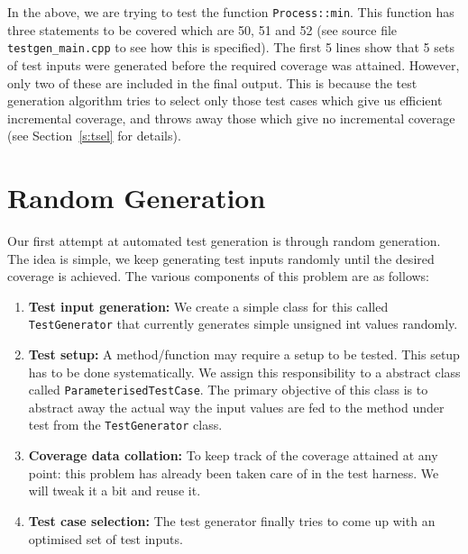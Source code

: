 \documentclass[12pts]{report}
\begin{document}
In the above, we are trying to test the function \lstinline[style=jc]|Process::min|. This function has three statements to be covered which are 50, 51 and 52 (see source file \verb|testgen_main.cpp| to see how this is specified). The first 5 lines show that 5 sets of test inputs were generated before the required coverage was attained. However, only two of these are included in the final output. This is because the test generation algorithm tries to select only those test cases which give us efficient incremental coverage, and throws away those which give no incremental coverage (see Section~\ref{s:tsel} for details).

\section{Random Generation}
Our first attempt at automated test generation is through random generation. The idea is simple, we keep generating test inputs randomly until the desired coverage is achieved. The various components of this problem are as follows:
\begin{enumerate}
\item \textbf{Test input generation:} We create a simple class for this called \lstinline[style=jc]|TestGenerator| that currently generates simple unsigned int values randomly.
\item \textbf{Test setup:} A method/function may require a setup to be tested. This setup has to be done systematically. We assign this responsibility to a abstract class called \lstinline[style=jc]|ParameterisedTestCase|. The primary objective of this class is to abstract away the actual way the input values are fed to the method under test from the \lstinline[style=jc]|TestGenerator| class.
\item \textbf{Coverage data collation:} To keep track of the coverage attained at any point: this problem has already been taken care of in the test harness. We will tweak it a bit and reuse it.
\item \textbf{Test case selection:} The test generator finally tries to come up with an optimised set of test inputs.
\end{enumerate}
\end{document}
